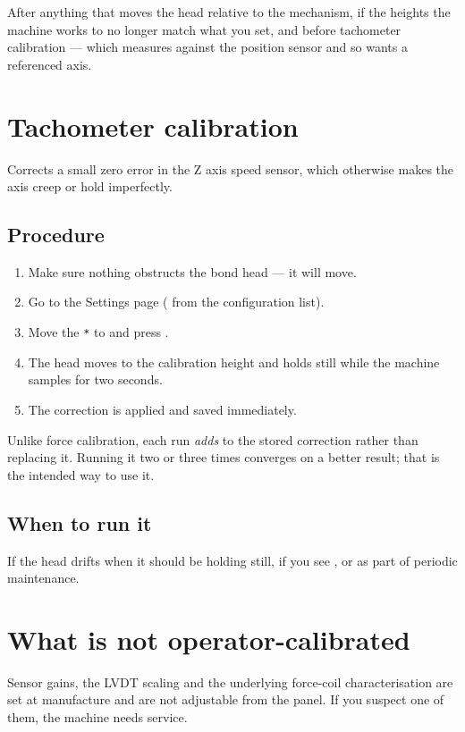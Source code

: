 After anything that moves the head relative to the mechanism, if the heights
the machine works to no longer match what you set, and before tachometer
calibration --- which measures against the position sensor and so wants a
referenced axis.

\section{Tachometer calibration}
\label{sec:tach-cal}

Corrects a small zero error in the Z axis speed sensor, which otherwise makes
the axis creep or hold imperfectly.

\subsection*{Procedure}

\begin{enumerate}[leftmargin=*]
\item Make sure nothing obstructs the bond head --- it will move.
\item Go to the Settings page ( from the configuration list).
\item Move the \texttt{*} to  and press
  .
\item The head moves to the calibration height and holds still while the
  machine samples for two seconds.
\item The correction is applied and saved immediately.
\end{enumerate}

\begin{wbnote}
Unlike force calibration, each run \emph{adds} to the stored correction rather
than replacing it. Running it two or three times converges on a better result;
that is the intended way to use it.
\end{wbnote}

\subsection*{When to run it}

If the head drifts when it should be holding still, if you see
, or as part of periodic maintenance.

\section{What is not operator-calibrated}

Sensor gains, the LVDT scaling and the underlying force-coil characterisation
are set at manufacture and are not adjustable from the panel. If you suspect
one of them, the machine needs service.
